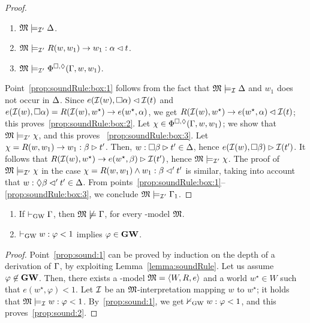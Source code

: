 \begin{proof}
  \begin{enumerate}[label=(\roman*), ref=(\roman*),leftmargin=*]    
  \item\label{prop:soundRule:box:1}     
 $\mathfrak{M}\models_{\mathcal{I}'}\Delta$.

\item\label{prop:soundRule:box:2}     
$\mathfrak{M}\models_{\mathcal{I}'} R(w,w_1)\to w_1:\alpha\lhd t$.

\item\label{prop:soundRule:box:3}     
  $\mathfrak{M}\models_{\mathcal{I}'} \Phi^{\Box,\lozenge}(\Gamma,w,w_1)$.
  \end{enumerate}
  Point~\ref{prop:soundRule:box:1} follows from the fact that $\mathfrak{M}\models_{\mathcal{I}}\Delta$ and $w_1$ does not occur in $\Delta$.
  Since $e(\mathcal{I}(w),\Box \alpha)\lhd \mathcal{I}(t)$ and $e(\mathcal{I}(w),\Box
    \alpha) = R(\mathcal{I}(w),w^\star)\to e(w^\star,\alpha)$, we get
    $R(\mathcal{I}(w),w^\star)\to e(w^\star,\alpha)\lhd \mathcal{I}(t)$; this proves~\ref{prop:soundRule:box:2}.
    Let $\chi\in\Phi^{\Box,\lozenge}(\Gamma,w,w_1)$;  we show that  $\mathfrak{M}\models_{\mathcal{I}'}\chi$,
    and this proves ~\ref{prop:soundRule:box:3}.
    Let  $\chi=R(w,w_1)\to w_1:\beta\rhd t'$. Then,  $w : \Box \beta \rhd t'\in \Delta$,
hence $e(\mathcal{I}(w),\Box \beta) \rhd \mathcal{I}(t')$. It follows that
 $R(\mathcal{I}(w),w^\star)\to e(w^\star,\beta)\rhd
 \mathcal{I}(t')$,  hence $\mathfrak{M}\models_{\mathcal{I}'} \chi$.
 The  proof of   $\mathfrak{M}\models_{\mathcal{I}'} \chi$ in the  case $\chi= R(w,w_1)\wedge w_1 : \beta  \lhd' t'$ is similar,
 taking into account that  $w : \lozenge \beta \lhd' t'\in \Delta$.
From points~\ref{prop:soundRule:box:1}--\ref{prop:soundRule:box:3}, we conclude  $\mathfrak{M}\models_{\mathcal{I}'} \Gamma_1$.  
\end{proof}




\begin{proposition}[Soundness]\label{prop:sound}
  \begin{enumerate}[label=(\roman*), ref=(\roman*),leftmargin=*]    
  \item\label{prop:sound:1} If $\vdash_{\mathrm{GW}} \Gamma$, then $\mathfrak{M}\not\models
    \Gamma$, for every \GWM-model $\mathfrak{M}$.
    
  \item\label{prop:sound:2} $\vdash_{\mathrm{GW}} w:\varphi < 1$ implies
    $\varphi\in\mathbf{GW}$.
  \end{enumerate}
\end{proposition}

\begin{proof} 
  Point~\ref{prop:sound:1} can be  proved by induction on the
  depth of a derivation of $\Gamma$, by exploiting
  Lemma~\ref{lemma:soundRule}.  Let
  us  assume  $\varphi\not\in\mathbf{GW}$.  Then, there exists a \GWM-model
  $\mathfrak{M}=\langle W,R,e \rangle$ and a world $ w^\star\in W$ such that
  $e(w^\star,\varphi) < 1$.  Let $\mathcal{I}$ be an $\mathfrak{M}$-interpretation
  mapping $w$ to $w^\star$; it holds that $\mathfrak{M}\models_{\mathcal{I}} w:\varphi < 1$. 
  By~\ref{prop:sound:1},
we get $\nvdash_{\mathrm{GW}} w:\varphi < 1$, and this
proves~\ref{prop:sound:2}. 
\end{proof}





